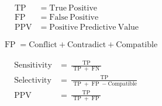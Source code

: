 \documentclass{amsart}
\begin{document}
\begin{align*}
\operatorname{TP} & \hat{=} \mathrm{True\ Positive} \\ 
\operatorname{FP} & \hat{=} \mathrm{False\ Positive} \\ 
\operatorname{PPV} & \hat{=} \mathrm{Positive\ Predictive\ Value}
\end{align*}

\begin{align*}
& \operatorname{FP} = \mathrm{Conflict+Contradict+Compatible}
\end{align*}

\begin{align*}
\operatorname{Sensitivity} & = \frac{\operatorname{TP}}{\operatorname{TP} + \operatorname{FN}} \\ 
\operatorname{Selectivity} & = \frac{\operatorname{TP}}{\operatorname{TP} + \operatorname{FP} - \mathrm{Compatible}} \\ 
\operatorname{PPV} & = \frac{\operatorname{TP}}{\operatorname{TP} + \operatorname{FP}}
\end{align*}
\end{document}
